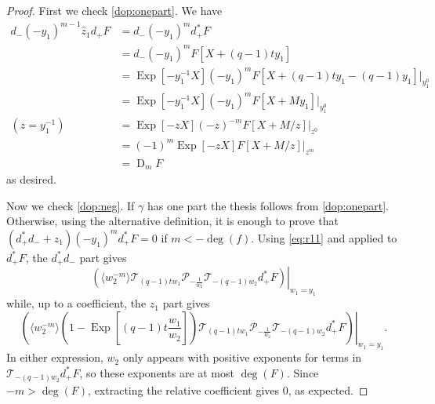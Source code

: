\documentclass[reqno]{amsart}
\theoremstyle{plain}
\theoremstyle{definition}
\theoremstyle{remark}
\DeclareMathOperator{\D}{D}
\DeclareMathOperator{\Exp}{Exp}
\newcommand{\z}{\widehat{z}}
\newcommand{\<}{\langle}
\renewcommand{\>}{\rangle}
\begin{document}
\begin{proof}
    First we check \eqref{dop:onepart}. We have
    \begin{align*}
        d_- (-y_1)^{m-1} \z_1 d_+ F & = d_- (-y_1)^m d_+^* F \\
        & = d_- (-y_1)^m F[X + (q-1)ty_1] \\
        & = \Exp[-y_1^{-1} X] (-y_1)^m F[X + (q-1)ty_1 - (q-1)y_1] \rvert_{y_1^0} \\
        & = \Exp[-y_1^{-1} X] (-y_1)^m F[X + M y_1] \rvert_{y_1^0} \\
        (z = y_1^{-1}) & = \Exp[-zX] (-z)^{-m} F[X + M/z] \rvert_{z^0} \\
        & = (-1)^m \Exp[-zX] F[X + M/z] \rvert_{z^m} \\
        & = \D_{m} F
    \end{align*}
    as desired.

    Now we check \eqref{dop:neg}. If $\gamma$ has one part the thesis follows from \eqref{dop:onepart}. Otherwise, using the alternative definition, it is enough to prove that $(d_+^* d_- + z_1) (-y_1)^m d_+^* F = 0$ if $m < - \deg(f)$.
    Using \eqref{eq:r11} and  applied to $d_+^* F$, the $d_+^* d_-$ part gives
    \[ 
        \left. \left(\langle w_2^{-m} \rangle \mathcal{T}_{(q-1)t w_1} \mathcal{P}_{-\frac{1}{w_2}} \mathcal{T}_{-(q-1)w_2} d_+^* F \right) \right\rvert_{w_1=y_1}
    \]
    while, up to a coefficient, the $z_1$ part gives 
    \[ 
        \left. \left(\langle w_2^{-m} \rangle \left(1-\Exp\left[(q-1)t\frac{w_1}{w_2}\right] \right) \mathcal{T}_{(q-1)tw_1}\mathcal{P}_{-\frac{1}{w_2}} \mathcal{T}_{-(q-1)w_2} d_+^* F \right)\right\rvert_{w_1=y_1}.
    \]
    In either expression, $w_2$ only appears with positive exponents for terms in $\mathcal{T}_{-(q-1)w_2} d_+^* F$, so these exponents are at most $\deg(F)$. Since $-m > \deg(F)$, extracting the relative coefficient gives $0$, as expected.


\end{proof}
\end{document}
